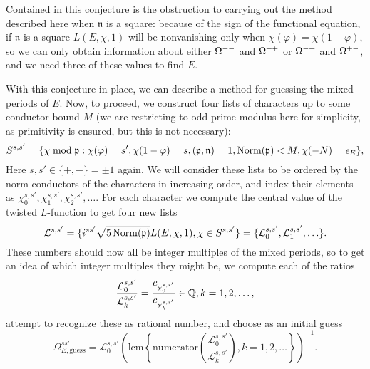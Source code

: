 \documentclass{amsart}
\newcommand{\n}{\mathfrak{n}}
\renewcommand{\phi}{\varphi}
\begin{document}
\begin{remark}
Contained in this conjecture is the obstruction to carrying out the method described here when 
$\n$ is a square: because of the sign of the functional equation, if $\n$ is a square $L(E, \chi, 1)$
will be nonvanishing only when $\chi(\varphi) = \chi(1 - \varphi)$, so we can only obtain
information about either $\Omega^{--}$ and $\Omega^{++}$ or $\Omega^{-+}$ and $\Omega^{+-}$, and we need
three of these values to find $E$.
\end{remark}

With this conjecture in place, we can describe a method for guessing the mixed periods of
$E$.
Now, to proceed, we construct four lists of characters
up to some conductor bound $M$ (we are restricting to odd prime modulus here for simplicity,
as primitivity is ensured, but this is not necessary):
\[
    S^{s,s'} = \{ \chi \bmod \p : \chi(\phi) = s', \chi(1 - \phi) = s,
            (\p, \n) = 1, \Norm(\p) < M, \chi(-N) = \epsilon_E\},
\]
Here $s, s' \in \{+, -\} = \pm 1$ again. We will consider these lists to be ordered by the
norm conductors of the characters in increasing order, and index their elements as
$\chi^{s,s'}_0, \chi^{s,s'}_1, \chi^{s,s'}_2, \ldots$. For each character we compute the central
value of the twisted $L$-function to get four new lists
\[
    \mathcal{L}^{s,s'} = \{ i^{ss'}\sqrt{5 \operatorname{Norm}(\mathfrak{p}) } L(E,\chi,1), \chi \in S^{s,s'}\} =
        \{\mathcal{L}^{s,s'}_0, \mathcal{L}^{s,s'}_1, \ldots\}.
\]
These numbers should now all be integer multiples of the mixed periods, so to get an idea
of which integer multiples they might be, we compute each of the ratios 
\[
    \frac{\mathcal{L}^{s,s'}_0}{\mathcal{L}^{s,s'}_k} = \frac{c_{\chi^{s,s'}_0}}{c_{\chi^{s,s'}_k}} \in \mathbb{Q}, k = 1, 2, \ldots,
\]
attempt to recognize these as rational number, and 
choose as an initial guess
\[
    \Omega^{ss'}_{E, \mathrm{guess}} = \mathcal{L}^{s,s'}_0\left(\mathrm{lcm}\left\{ \mathrm{numerator}\left(\frac{\mathcal{L}^{s,s'}_0}{\mathcal{L}^{s,s'}_k}\right), k = 1,2, \ldots \right\}\right)^{-1}.
\]
\end{document}
